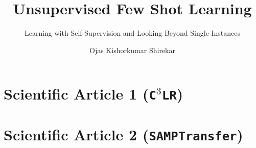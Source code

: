\documentclass[whitelogo]{TUD-report2020}
\newcommand{\ccclr}{\texttt{C$^3$LR}}
\def\samptr{\texttt{SAMPTransfer}}
\begin{document}
\captionsetup{format=plain, font=small, labelfont=bf, justification=RaggedRight}
\frontmatter


\title[tudelft-white]{Unsupervised Few Shot Learning}
\subtitle[tudelft-white]{Learning with Self-Supervision and Looking Beyond Single Instances}
\author[tudelft-white]{Ojas Kishorkumar Shirekar}
\makecover[split]






\tableofcontents

\mainmatter



\chapter{Scientific Article 1 (\ccclr)}\label{chap:c3lr-art}


\chapter{Scientific Article 2 (\samptr)}\label{chap:samp-transfer-art}

% 
\end{document}
